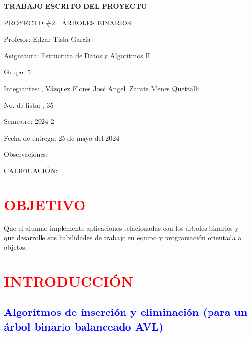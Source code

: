 \documentclass[12pt]{article}
\newcommand{\Profesor}{Profesor: Edgar Tista García}
\newcommand{\Materia}{Asignatura: Estructura de Datos y Algoritmos II}
\newcommand{\Grupo}{Grupo:  5}
\newcommand{\Nombre}{Integrantes: , Vázquez Flores José Angel, Zarate Menes Quetzalli}
\newcommand{\NoLista}{No. de lista: , 35}
\newcommand{\Proyecto}{PROYECTO \#2 - ÁRBOLES BINARIOS }
\newcommand{\Semestre}{Semestre: 2024-2}
\newcommand{\Fecha}{Fecha de entrega: 25 de mayo del 2024}
\newcommand{\Observaciones}{Observaciones:}
\newcommand{\Calificacion}{CALIFICACIÓN:}
\newcommand{\TituloP}{TRABAJO ESCRITO DEL PROYECTO }
\begin{document}
\begin{center}
    \LARGE\textbf{\TituloP}\par\vspace{0.7cm}
\end{center}
\Large{\Proyecto}\par\vspace{0.6cm}
\Large{\Profesor}\par\vspace{0.6cm}
\Large{\Materia}\par\vspace{0.6cm}
\Large{\Grupo}\par\vspace{0.6cm}
\Large{\Nombre}\par\vspace{0.6cm}
\Large{\NoLista}\par\vspace{0.6cm}
\Large{\Semestre}\par\vspace{0.6cm}
\Large{\Fecha}\par\vspace{0.6cm}
\Large{\Observaciones}\par\vspace{0.6cm}

\begin{center}
    \Large{\Calificacion}\par\vspace{0.6cm}
\end{center}

\newpage
\section*{\textcolor{red}{\textbf{OBJETIVO}}}
\par\vspace{0.4cm}
Que el alumno implemente aplicaciones relacionadas con los árboles binarios y que desarrolle sus habilidades de trabajo en equipo y programación orientada a objetos. 
\par\vspace{1.5cm}

\section*{\textcolor{red}{\textbf{INTRODUCCIÓN}}}



\subsection*{\textcolor{blue}{Algoritmos de inserción y eliminación (para un árbol binario balanceado AVL)}}
\end{document}
